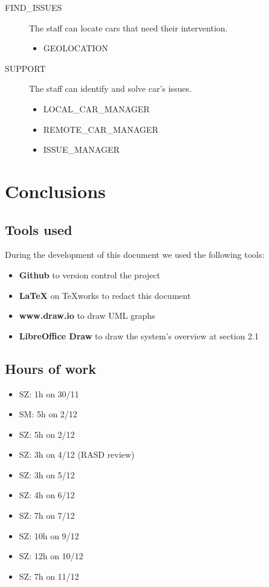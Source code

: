 \documentclass[11pt]{article} %
\begin{document}
\begin{description}
	\item[FIND\_ISSUES] The staff can locate cars that need their intervention.
		\begin{itemize}
			\item GEOLOCATION
		\end{itemize}

	\item[SUPPORT] The staff can identify and solve car’s issues.
		\begin{itemize}
			\item LOCAL\_CAR\_MANAGER
			\item REMOTE\_CAR\_MANAGER
			\item ISSUE\_MANAGER
		\end{itemize}
\end{description}




\newpage
\section{Conclusions}

\subsection{Tools used}
During the development of this document we used the following tools:
\begin{itemize}
	\item \textbf{Github} to version control the project
	\item \textbf{\LaTeX} on TeXworks to redact this document
	\item \textbf{www.draw.io} to draw UML graphs
	\item \textbf{LibreOffice Draw} to draw the system's overview at section 2.1
\end{itemize}

\subsection{Hours of work}
\begin{itemize}
	\item SZ: 1h on 30/11
	\item SM: 5h on 2/12
	\item SZ: 5h on 2/12
	\item SZ: 3h on 4/12 (RASD review)
	\item SZ: 3h on 5/12
	\item SZ: 4h on 6/12
	\item SZ: 7h on 7/12
	\item SZ: 10h on 9/12 
	\item SZ: 12h on 10/12
	\item SZ: 7h on 11/12
\end{itemize}
\end{document}
